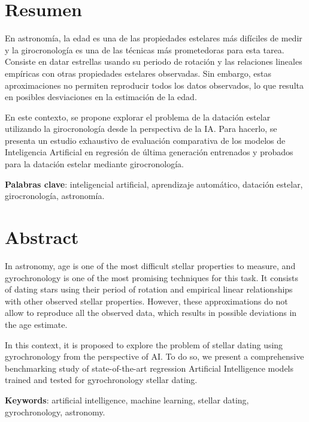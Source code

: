 \chapter{Resumen}

\vspace{0.5cm}

En astronomía, la edad es una de las propiedades estelares más difíciles de medir y la girocronología es una de las técnicas más prometedoras para esta tarea. Consiste en datar estrellas usando su periodo de rotación y las relaciones lineales empíricas con otras propiedades estelares observadas. Sin embargo, estas aproximaciones no permiten reproducir todos los datos observados, lo que resulta en posibles desviaciones en la estimación de la edad.

En este contexto, se propone explorar el problema de la datación estelar utilizando la girocronología desde la perspectiva de la IA. Para hacerlo, se presenta un estudio exhaustivo de evaluación comparativa de los modelos de Inteligencia Artificial en regresión de última generación entrenados y probados para la datación estelar mediante girocronología.

\vspace{1cm}

\textbf{Palabras clave}: inteligencial artificial, aprendizaje automático, datación estelar, girocronología, astronomía.


\newpage
\thispagestyle{empty}
\hspace*{0.5cm}
\newpage

\chapter{Abstract}

\vspace{0.5cm}


In astronomy, age is one of the most difficult stellar properties to measure, and gyrochronology is one of the most promising techniques for this task. It consists of dating stars using their period of rotation and empirical linear relationships with other observed stellar properties. However, these approximations do not allow to reproduce all the observed data, which results in possible deviations in the age estimate.

In this context, it is proposed to explore the problem of stellar dating using gyrochronology from the perspective of AI. To do so, we present a comprehensive benchmarking study of state-of-the-art regression Artificial Intelligence models trained and tested for gyrochronology stellar dating. 

\vspace{1cm}

\textbf{Keywords}: artificial intelligence, machine learning, stellar dating, gyrochronology, astronomy.


\newpage
\thispagestyle{empty}
\hspace*{0.5cm}
\newpage